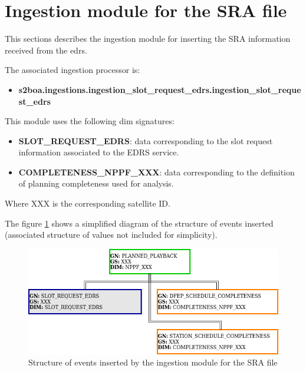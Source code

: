 \section{Ingestion module for the SRA file}

This sections describes the ingestion module for inserting the SRA information received from the \acrshort{edrs}.

The associated ingestion processor is:

\begin{itemize} 

\item \textbf{s2boa.ingestions.ingestion\_slot\_request\_edrs.ingestion\_slot\_request\_edrs}
  
\end{itemize}

This module uses the following \acrshort{dim} signatures:

\begin{itemize} 

\item \textbf{SLOT\_REQUEST\_EDRS}: data corresponding to the slot request information associated to the EDRS service.

\item \textbf{COMPLETENESS\_NPPF\_XXX}: data corresponding to the definition of planning completeness used for analysis.
  
\end{itemize}

Where XXX is the corresponding satellite ID.

The figure \ref{fg:structure_ingestion_slot_request_edrs} shows a simplified diagram of the structure of events inserted (associated structure of values not included for simplicity).

\begin{figure}[H]
  \begin{center}
	\centering\includegraphics[width=150mm]{../fig/structure_ingestion_slot_request_edrs.png}
	\caption{Structure of events inserted by the ingestion module for the SRA file}
	\label{fg:structure_ingestion_slot_request_edrs}
  \end{center}
\end{figure}

